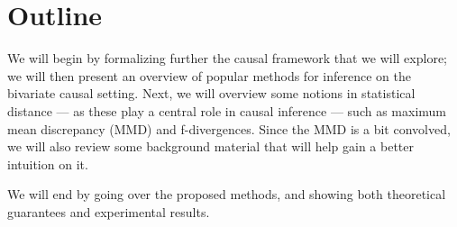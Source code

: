 \section{Outline}

We will begin by formalizing further the causal framework that we will explore; we will then present an overview of 
popular methods for inference on the bivariate causal setting. Next, we will overview some notions in statistical distance 
--- as these play a central role in causal inference --- such as maximum mean discrepancy (MMD) and f-divergences. 
Since the MMD is a bit convolved, we will also review some background material that will help gain a better intuition on it. 

We will end by going over the proposed methods, and showing both theoretical guarantees and experimental results. 




